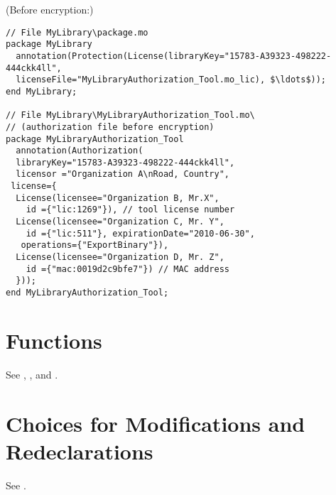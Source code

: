 \begin{example}
(Before encryption:)
\begin{lstlisting}[language=modelica]
// File MyLibrary\package.mo
package MyLibrary
  annotation(Protection(License(libraryKey="15783-A39323-498222-444ckk4ll",
  licenseFile="MyLibraryAuthorization_Tool.mo_lic), $\ldots$));
end MyLibrary;

// File MyLibrary\MyLibraryAuthorization_Tool.mo\
// (authorization file before encryption)
package MyLibraryAuthorization_Tool
  annotation(Authorization(
  libraryKey="15783-A39323-498222-444ckk4ll",
  licensor ="Organization A\nRoad, Country",
 license={
  License(licensee="Organization B, Mr.X",
    id ={"lic:1269"}), // tool license number
  License(licensee="Organization C, Mr. Y",
    id ={"lic:511"}, expirationDate="2010-06-30",
   operations={"ExportBinary"}),
  License(licensee="Organization D, Mr. Z",
    id ={"mac:0019d2c9bfe7"}) // MAC address
  }));
end MyLibraryAuthorization_Tool;
\end{lstlisting}
\end{example}


\section{Functions}\label{annotations-for-functions}

See , , and .


\section{Choices for Modifications and Redeclarations}\label{annotation-choices-for-modifications-and-redeclarations}\label{choices-for-modifications-and-redeclarations}

See .
